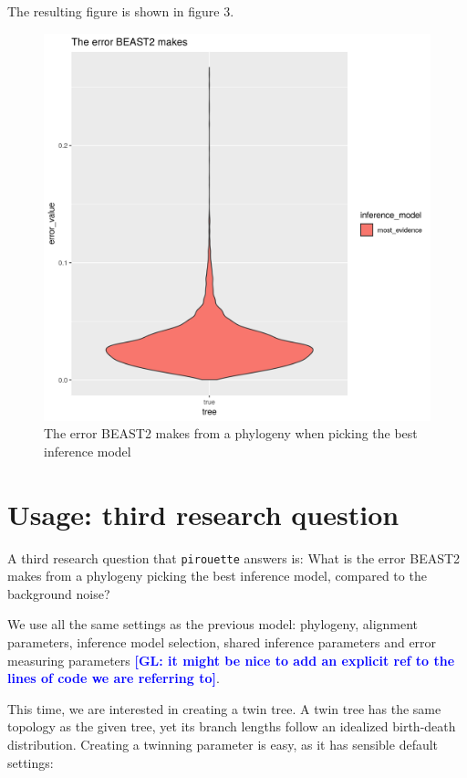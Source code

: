 \documentclass{article}
\newcommand{\giovanni}[1]{\textcolor{blue}{\textbf{[GL: #1]}}}
\begin{document}
The resulting figure is shown in figure 3.

\begin{figure}[h]
  \includegraphics[width=\textwidth]{figure_3.png}
  \caption{
    The error BEAST2 makes from a phylogeny when
    picking the best inference model
  }
\end{figure}

\section{Usage: third research question}

A third research question that \verb;pirouette; answers is:
What is the error BEAST2 makes from a phylogeny 
picking the best inference model, compared to the background noise?

We use all the same settings as the previous model:
phylogeny, alignment parameters, inference model selection,
shared inference parameters and error measuring parameters \giovanni{it might be nice to add an explicit ref to the lines of code we are referring to}.  

This time, we are interested in creating a twin tree. A twin tree
has the same topology as the given tree, yet its branch lengths follow
an idealized birth-death distribution. Creating a twinning parameter is easy,
as it has sensible default settings:
\end{document}
